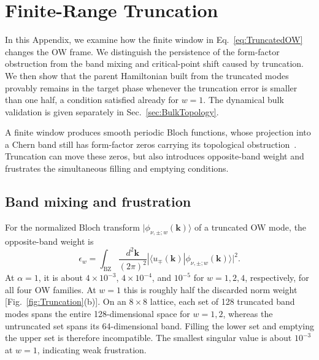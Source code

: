 \documentclass[aps,prb,10pt,twocolumn,superscriptaddress,longbibliography,floatfix]{revtex4-2}
\newcommand{\mr}[1]{\mathrm{#1}}
\newcommand{\bk}{\boldsymbol k}
\newcommand{\newtext}[1]{{\color{blue}#1}}
\newcommand{\claudeadd}[1]{{\color{orange}#1}}
\begin{document}
\appendix
\setcounter{figure}{0}
\renewcommand{\thefigure}{A\arabic{figure}}
\renewcommand{\theHfigure}{A\arabic{figure}}

{\color{blue}\section{Finite-Range Truncation}
\label{app:Truncation}}

{\color{blue}
In this Appendix, we examine how the finite window in Eq.~\eqref{eq:TruncatedOW} changes the OW frame. We distinguish the persistence of the form-factor obstruction from the band mixing and critical-point shift caused by truncation. \claudeadd{We then show that the parent Hamiltonian built from the truncated modes provably remains in the target phase whenever the truncation error is smaller than one half, a condition satisfied already for $w=1$.} The dynamical bulk validation is given separately in Sec.~\ref{sec:BulkTopology}.
}

\newtext{A finite window produces smooth periodic Bloch functions, whose projection into a Chern band still has form-factor zeros carrying its topological obstruction~\cite{BhuiyanPanJian2026,DubailRead2015}. Truncation can move these zeros, but also introduces opposite-band weight and frustrates the simultaneous filling and emptying conditions.}

{\color{blue}
\subsection{Band mixing and frustration}
\newtext{For the normalized Bloch transform $|\phi_{\nu,\pm;w}(\bk)\rangle$ of a truncated OW mode, the opposite-band weight is}
\begin{equation}
 \epsilon_w=\int_{\mr{BZ}}\frac{d^2\bk}{(2\pi)^2}
 |\langle u_\mp(\bk)|\phi_{\nu,\pm;w}(\bk)\rangle|^2.
 \label{eq:BandLeakage}
\end{equation}
\newtext{At $\alpha=1$, it is about $4\times10^{-3}$, $4\times10^{-4}$, and $10^{-5}$ for $w=1,2,4$, respectively, for all four OW families. At $w=1$ this is roughly half the discarded norm weight [Fig.~\ref{fig:Truncation}(b)]. On an $8\times8$ lattice, each set of 128 truncated band modes spans the entire 128-dimensional space for $w=1,2$, whereas the untruncated set spans its 64-dimensional band. Filling the lower set and emptying the upper set is therefore incompatible. The smallest singular value is about $10^{-3}$ at $w=1$, indicating weak frustration.}

}
\end{document}
